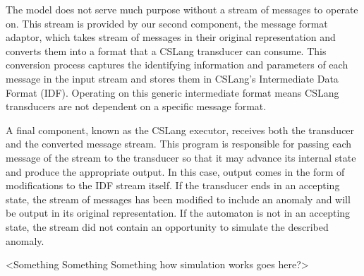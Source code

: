 The model does not serve much purpose without a stream of messages to
operate on.
This stream is provided by our second component,
the message format adaptor,
which takes
stream of messages in their original representation and converts
them into a format that a CSLang transducer can consume. This conversion process
captures the identifying information and parameters of each message in the
input stream and stores them in CSLang's Intermediate Data Format (IDF).
Operating on this generic intermediate format means CSLang transducers are
not dependent on a specific message format.

A final component, known as the CSLang executor,
receives both the transducer and the converted message stream.
This program is responsible for passing each message of the stream
to the transducer
so that it may advance its internal state and
produce the appropriate output.
In this case, output comes in the form of modifications to the IDF stream itself.
If the transducer
ends in an accepting state, the stream of messages has
been modified to include an anomaly and will be output in its original
representation.  If the automaton is not in an accepting state, the stream
did not contain an opportunity to simulate the described anomaly.

<Something Something Something how simulation works goes here?>


